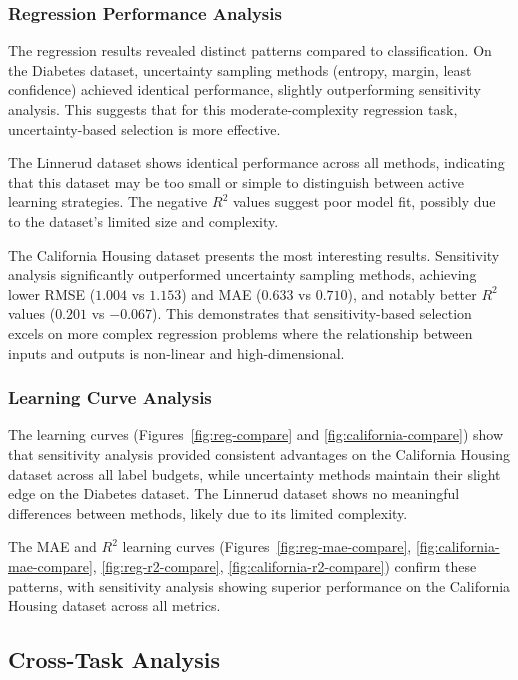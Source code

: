 \documentclass[conference]{IEEEtran}
\begin{document}
\subsubsection{Regression Performance Analysis}

The regression results revealed distinct patterns compared to classification. On the Diabetes dataset, uncertainty sampling methods (entropy, margin, least confidence) achieved identical performance, slightly outperforming sensitivity analysis. This suggests that for this moderate-complexity regression task, uncertainty-based selection is more effective.

The Linnerud dataset shows identical performance across all methods, indicating that this dataset may be too small or simple to distinguish between active learning strategies. The negative $R^2$ values suggest poor model fit, possibly due to the dataset's limited size and complexity.

The California Housing dataset presents the most interesting results. Sensitivity analysis significantly outperformed uncertainty sampling methods, achieving lower RMSE ($1.004$ vs $1.153$) and MAE ($0.633$ vs $0.710$), and notably better $R^2$ values ($0.201$ vs $-0.067$). This demonstrates that sensitivity-based selection excels on more complex regression problems where the relationship between inputs and outputs is non-linear and high-dimensional.

\subsubsection{Learning Curve Analysis}

The learning curves (Figures~\ref{fig:reg-compare} and \ref{fig:california-compare}) show that sensitivity analysis provided consistent advantages on the California Housing dataset across all label budgets, while uncertainty methods maintain their slight edge on the Diabetes dataset. The Linnerud dataset shows no meaningful differences between methods, likely due to its limited complexity.

The MAE and $R^2$ learning curves (Figures~\ref{fig:reg-mae-compare}, \ref{fig:california-mae-compare}, \ref{fig:reg-r2-compare}, \ref{fig:california-r2-compare}) confirm these patterns, with sensitivity analysis showing superior performance on the California Housing dataset across all metrics.

\subsection{Cross-Task Analysis}
\end{document}

